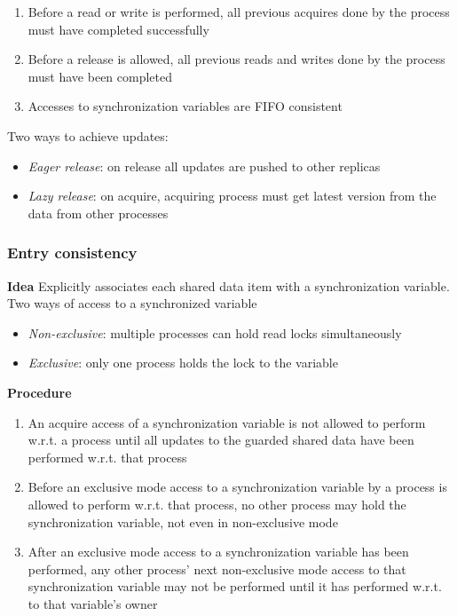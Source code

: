 \begin{enumerate}
    \def\labelenumi{\arabic{enumi}.}
    \itemsep1pt\parskip0pt
    \item
      Before a read or write is performed, all previous acquires done by the
      process must have completed successfully
    \item
      Before a release is allowed, all previous reads and writes done by the
      process must have been completed
    \item
      Accesses to synchronization variables are FIFO consistent
\end{enumerate}
Two ways to achieve updates:

\begin{itemize}
    \itemsep1pt\parskip0pt
    \item
      \emph{Eager release}: on release all updates are pushed to other
      replicas
    \item
      \emph{Lazy release}: on acquire, acquiring process must get latest
      version from the data from other processes
\end{itemize}

\subsubsection{Entry consistency}

\textbf{Idea} Explicitly associates each shared data item with a
synchronization variable.\\
Two ways of access to a synchronized variable

\begin{itemize}
    \itemsep1pt\parskip0pt
    \item
      \emph{Non-exclusive}: multiple processes can hold read locks
      simultaneously
    \item
      \emph{Exclusive}: only one process holds the lock to the variable
\end{itemize}

\textbf{Procedure}

\begin{enumerate}
    \def\labelenumi{\arabic{enumi}.}
    \itemsep1pt\parskip0pt
    \item
      An acquire access of a synchronization variable is not allowed to
      perform w.r.t. a process until all updates to the guarded shared data
      have been performed w.r.t. that process
    \item
      Before an exclusive mode access to a synchronization variable by a
      process is allowed to perform w.r.t. that process, no other process may
      hold the synchronization variable, not even in non-exclusive mode
    \item
      After an exclusive mode access to a synchronization variable has been
      performed, any other process' next non-exclusive mode access to that
      synchronization variable may not be performed until it has performed
      w.r.t. to that variable's owner
\end{enumerate}

